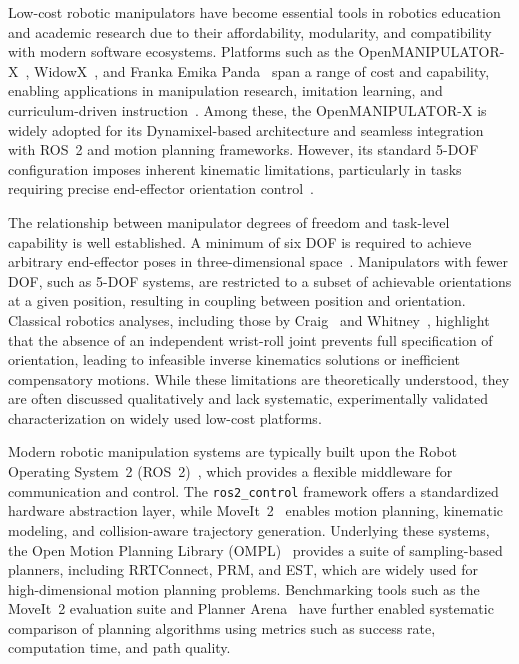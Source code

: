 \documentclass[conference]{IEEEtran}
\begin{document}
	Low-cost robotic manipulators have become essential tools in robotics
	education and academic research due to their affordability, modularity,
	and compatibility with modern software ecosystems. Platforms such as the
	OpenMANIPULATOR-X~\cite{robotis2023openmanipulator},
	WidowX~\cite{zhao2021widowx}, and Franka Emika Panda~\cite{franka2023panda}
	span a range of cost and capability, enabling applications in
	manipulation research, imitation learning, and curriculum-driven
	instruction~\cite{muepu2025toward}. Among these, the
	OpenMANIPULATOR-X is widely adopted for its Dynamixel-based architecture
	and seamless integration with ROS~2 and motion planning frameworks.
	However, its standard 5-DOF configuration imposes inherent kinematic
	limitations, particularly in tasks requiring precise end-effector
	orientation control~\cite{norton2020developing}.
	
	The relationship between manipulator degrees of freedom and task-level
	capability is well established. A minimum of six DOF is required to
	achieve arbitrary end-effector poses in three-dimensional
	space~\cite{craig2005introduction}. Manipulators with fewer DOF, such
	as 5-DOF systems, are restricted to a subset of achievable orientations
	at a given position, resulting in coupling between position and
	orientation. Classical robotics analyses, including those by
	Craig~\cite{craig2005introduction} and Whitney~\cite{whitney1969resolved},
	highlight that the absence of an independent wrist-roll joint prevents
	full specification of orientation, leading to infeasible inverse
	kinematics solutions or inefficient compensatory motions. While these
	limitations are theoretically understood, they are often discussed
	qualitatively and lack systematic, experimentally validated
	characterization on widely used low-cost platforms.
	
	Modern robotic manipulation systems are typically built upon the Robot
	Operating System~2 (ROS~2)~\cite{macenski2022ros2control}, which
	provides a flexible middleware for communication and control. The
	\texttt{ros2\_control} framework offers a standardized hardware
	abstraction layer, while MoveIt~2~\cite{chitta2016moveit} enables
	motion planning, kinematic modeling, and collision-aware trajectory
	generation. Underlying these systems, the Open Motion Planning Library
	(OMPL)~\cite{sucan2012ompl} provides a suite of sampling-based
	planners, including RRTConnect, PRM, and EST, which are widely used for
	high-dimensional motion planning problems. Benchmarking tools such as
	the MoveIt~2 evaluation suite and Planner Arena~\cite{plannerarena}
	have further enabled systematic comparison of planning algorithms using
	metrics such as success rate, computation time, and path quality.
	
\end{document}
